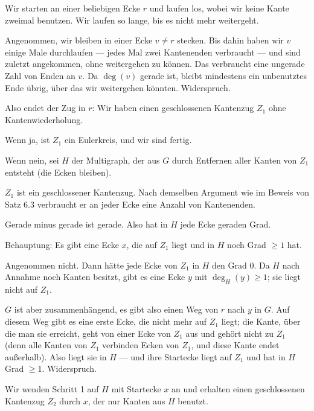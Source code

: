 \begin{merksatz}
Wir starten an einer beliebigen Ecke $r$ und laufen los, wobei wir keine Kante zweimal benutzen. Wir laufen so lange, bis es nicht mehr weitergeht.

 Angenommen, wir bleiben in einer Ecke $v \neq r$ stecken. Bis dahin haben wir $v$ einige Male durchlaufen --- jedes Mal zwei Kantenenden verbraucht --- und sind zuletzt angekommen, ohne weitergehen zu können. Das verbraucht eine ungerade Zahl von Enden an $v$. Da $\deg(v)$ gerade ist, bleibt mindestens ein unbenutztes Ende übrig, über das wir weitergehen könnten. Widerspruch.

Also endet der Zug in $r$: Wir haben einen geschlossenen Kantenzug $Z_1$ ohne Kantenwiederholung.

Wenn ja, ist $Z_1$ ein Eulerkreis, und wir sind fertig.

Wenn nein, sei $H$ der Multigraph, der aus $G$ durch Entfernen aller Kanten von $Z_1$ entsteht (die Ecken bleiben).

$Z_1$ ist ein geschlossener Kantenzug. Nach demselben Argument wie im Beweis von Satz 6.3 verbraucht er an jeder Ecke eine  Anzahl von Kantenenden.

Gerade minus gerade ist gerade. Also hat in $H$ jede Ecke geraden Grad.

Behauptung: Es gibt eine Ecke $x$, die auf $Z_1$ liegt und in $H$ noch Grad $\ge 1$ hat.

Angenommen nicht. Dann hätte jede Ecke von $Z_1$ in $H$ den Grad $0$. Da $H$ nach Annahme noch Kanten besitzt, gibt es eine Ecke $y$ mit $\deg_H(y) \ge 1$; sie liegt nicht auf $Z_1$.

$G$ ist aber zusammenhängend, es gibt also einen Weg von $r$ nach $y$ in $G$. Auf diesem Weg gibt es eine erste Ecke, die nicht mehr auf $Z_1$ liegt; die Kante, über die man sie erreicht, geht von einer Ecke von $Z_1$ aus und gehört nicht zu $Z_1$ (denn alle Kanten von $Z_1$ verbinden Ecken von $Z_1$, und diese Kante endet außerhalb). Also liegt sie in $H$ --- und ihre Startecke liegt auf $Z_1$ und hat in $H$ Grad $\ge 1$. Widerspruch.

Wir wenden Schritt 1 auf $H$ mit Startecke $x$ an und erhalten einen geschlossenen Kantenzug $Z_2$ durch $x$, der nur Kanten aus $H$ benutzt.


\end{merksatz}
